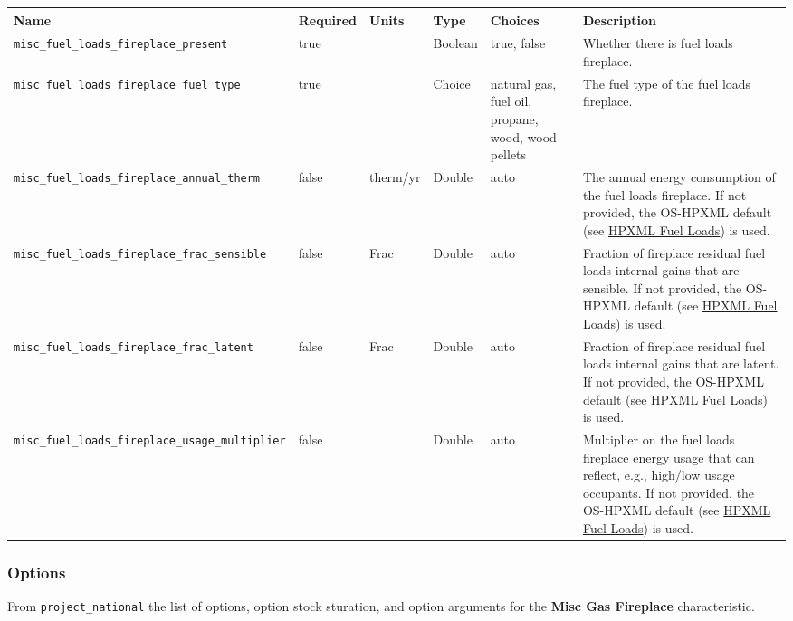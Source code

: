\begin{longtable}[]{@{}llllll@{}}
\toprule\noalign{}
Name & Required & Units & Type & Choices & Description \\
\midrule\noalign{}
\endhead
\bottomrule\noalign{}
\endlastfoot
\texttt{misc\_fuel\_loads\_fireplace\_present} & true & & Boolean &
true, false & Whether there is fuel loads fireplace. \\
\texttt{misc\_fuel\_loads\_fireplace\_fuel\_type} & true & & Choice &
natural gas, fuel oil, propane, wood, wood pellets & The fuel type of
the fuel loads fireplace. \\
\texttt{misc\_fuel\_loads\_fireplace\_annual\_therm} & false & therm/yr
& Double & auto & The annual energy consumption of the fuel loads
fireplace. If not provided, the OS-HPXML default (see
\href{https://openstudio-hpxml.readthedocs.io/en/v1.7.0/workflow_inputs.html\#hpxml-fuel-loads}{HPXML
Fuel Loads}) is used. \\
\texttt{misc\_fuel\_loads\_fireplace\_frac\_sensible} & false & Frac &
Double & auto & Fraction of fireplace residual fuel
loads\textquotesingle{} internal gains that are sensible. If not
provided, the OS-HPXML default (see
\href{https://openstudio-hpxml.readthedocs.io/en/v1.7.0/workflow_inputs.html\#hpxml-fuel-loads}{HPXML
Fuel Loads}) is used. \\
\texttt{misc\_fuel\_loads\_fireplace\_frac\_latent} & false & Frac &
Double & auto & Fraction of fireplace residual fuel
loads\textquotesingle{} internal gains that are latent. If not provided,
the OS-HPXML default (see
\href{https://openstudio-hpxml.readthedocs.io/en/v1.7.0/workflow_inputs.html\#hpxml-fuel-loads}{HPXML
Fuel Loads}) is used. \\
\texttt{misc\_fuel\_loads\_fireplace\_usage\_multiplier} & false & &
Double & auto & Multiplier on the fuel loads fireplace energy usage that
can reflect, e.g., high/low usage occupants. If not provided, the
OS-HPXML default (see
\href{https://openstudio-hpxml.readthedocs.io/en/v1.7.0/workflow_inputs.html\#hpxml-fuel-loads}{HPXML
Fuel Loads}) is used. \\
\end{longtable}

\subsubsection{Options}\label{options-116}

From \texttt{project\_national} the list of options, option stock
sturation, and option arguments for the \textbf{Misc Gas Fireplace}
characteristic.

